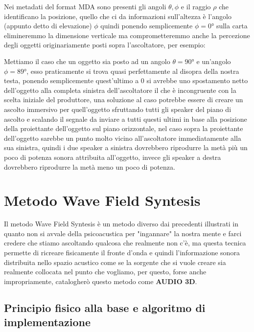 \documentclass[12pt,a4paper]{report}
\begin{document}
Nei metadati del format MDA sono presenti gli angoli $\theta, \phi$ e il raggio $\rho$ che identificano la posizione, quello che ci da informazioni sull'altezza è l'angolo (appunto detto di elevazione) $\phi$ quindi ponendo semplicemente $\phi=0°$ sulla carta elimineremmo la dimensione verticale ma comprometteremmo anche la percezione degli oggetti originariamente posti sopra l'ascoltatore, per esempio:

Mettiamo il caso che un oggetto sia posto ad un angolo $	\theta= 90° $ e un'angolo $\phi=89°$, esso praticamente si trova quasi perfettamente al disopra della nostra testa, ponendo semplicemente quest'ultimo a $0$ si avrebbe uno spostamento netto dell'oggetto alla completa sinistra dell'ascoltatore il che è incongruente con la scelta iniziale del produttore, una soluzione al caso potrebbe essere di creare un ascolto immersivo per quell'oggetto sfruttando tutti gli speaker del piano di ascolto e scalando il segnale da inviare a tutti questi ultimi in base alla posizione della proiettante dell'oggetto sul piano orizzontale, nel caso sopra la proiettante dell'oggetto sarebbe un punto molto vicino all'ascoltatore immediatamente alla sua sinistra, quindi i due speaker a sinistra dovrebbero riprodurre la metà più un poco di potenza sonora attribuita all'oggetto, invece gli speaker a destra dovrebbero riprodurre la metà meno un poco di potenza.















\chapter{Metodo Wave Field Syntesis}

Il metodo Wave Field Syntesis è un metodo diverso dai precedenti illustrati in quanto non si avvale della psicoacustica per "ingannare" la nostra mente e farci credere che stiamo ascoltando qualcosa che realmente non c'è, ma questa tecnica permette di ricreare fisicamente il fronte d'onda e quindi l'informazione sonora distribuita nello spazio acustico come se la sorgente che si vuole creare sia realmente collocata nel punto che vogliamo, per questo, forse anche impropriamente, catalogherò questo metodo come \textbf{AUDIO 3D}.\\

\section{Principio fisico alla base e algoritmo di implementazione}
\end{document}
